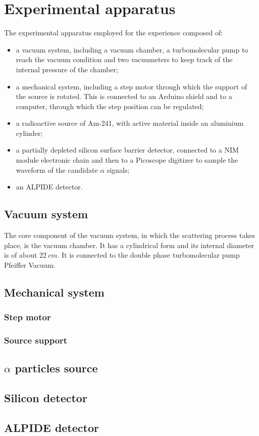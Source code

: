 \documentclass[../../main/main.tex]{subfiles}
\begin{document}
\section{Experimental apparatus}
The experimental apparatus employed for the experience composed of:
\begin{itemize}
    \item a vacuum system, including a vacuum chamber, a turbomolecular pump to reach the vacuum condition and two vacuumeters to keep track of the internal pressure of the chamber;
    \item a mechanical system, including a step motor through which the support of the source is rotated. This is connected to an Arduino shield and to a computer, through which the step position can be regulated;
    \item a radioactive source of Am-241, with active material inside an aluminium cylinder;
    \item a partially depleted silicon surface barrier detector, connected to a NIM module electronic chain and then to a Picoscope digitizer to sample the waveform of the candidate \( \alpha \) signals;
    \item an ALPIDE detector.
\end{itemize}



\subsection{Vacuum system}
The core component of the vacuum system, in which the scattering process takes place, is the vacuum chamber. It has a cylindrical form and its internal diameter is of about \( 22 \ \si{cm} \). It is connected to the double phase turbomolecular pump Pfeiffer Vacuum.


\subsection{Mechanical system}

\subsubsection{Step motor}

\subsubsection{Source support}






\subsection{\boldmath \( \alpha  \) particles source}



\subsection{Silicon detector}



\subsection{ALPIDE detector}
\end{document}
